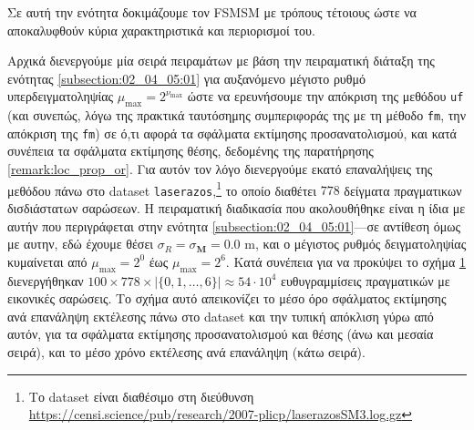 Σε αυτή την ενότητα δοκιμάζουμε τον FSMSM με τρόπους τέτοιους ώστε να
αποκαλυφθούν κύρια χαρακτηριστικά και περιορισμοί του.

Αρχικά διενεργούμε μία σειρά πειραμάτων με βάση την πειραματική διάταξη της
ενότητας \ref{subsection:02_04_05:01} για αυξανόμενο μέγιστο ρυθμό
υπερδειγματοληψίας $\mu_{\max} = 2^{\nu_{\max}}$ ώστε να ερευνήσουμε την
απόκριση της μεθόδου \texttt{uf} (και συνεπώς, λόγω της πρακτικά ταυτόσημης
συμπεριφοράς της με τη μέθοδο \texttt{fm}, την απόκριση της \texttt{fm}) σε
ό,τι αφορά τα σφάλματα εκτίμησης προσανατολισμού, και κατά συνέπεια τα σφάλματα
εκτίμησης θέσης, δεδομένης της παρατήρησης \ref{remark:loc_prop_or}. Για αυτόν
τον λόγο διενεργούμε εκατό επαναλήψεις της μεθόδου πάνω στο dataset
\texttt{laserazos},\footnote{Το dataset είναι διαθέσιμο στη διεύθυνση
\url{https://censi.science/pub/research/2007-plicp/laserazosSM3.log.gz}} το
οποίο διαθέτει $778$ δείγματα πραγματικων δισδιάστατων σαρώσεων. Η πειραματική
διαδικασία που ακολουθήθηκε είναι η ίδια με αυτήν που περιγράφεται στην ενότητα
\ref{subsection:02_04_05:01}---σε αντίθεση όμως με αυτην, εδώ έχουμε θέσει
$\sigma_R = \sigma_{\bm{M}} = 0.0$ m, και ο μέγιστος ρυθμός δειγματοληψίας
κυμαίνεται από $\mu_{\max} = 2^0$ έως $\mu_{\max} = 2^6$. Κατά συνέπεια για να
προκύψει το σχήμα \ref{fig:02_04_06:01} διενεργήθηκαν $100 \times 778 \times
|\{0,1,\dots,6\}| \approx 54\cdot 10^4$ ευθυγραμμίσεις πραγματικών με εικονικές
σαρώσεις. Το σχήμα αυτό απεικονίζει το μέσο όρο σφάλματος εκτίμησης ανά
επανάληψη εκτέλεσης πάνω στο dataset και την τυπική απόκλιση γύρω από αυτόν,
για τα σφάλματα εκτίμησης προσανατολισμού και θέσης (άνω και μεσαία σειρά), και
το μέσο χρόνο εκτέλεσης ανά επανάληψη (κάτω σειρά).

\begin{figure}[!h]\centering
  
  \caption{\small }
  \label{fig:02_04_06:01}
\end{figure}


